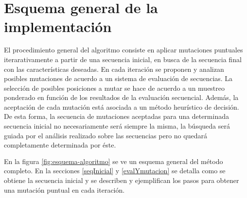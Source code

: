 
 










\section{Esquema general de la implementación}

El procedimiento general del algoritmo consiste en aplicar mutaciones puntuales iterarativamente a partir de una secuencia inicial, en busca de la secuencia final con las características deseadas.
En cada iteración se proponen y analizan posibles mutaciones de acuerdo a un sistema de evaluación de secuencias.
La selección de posibles posiciones a mutar se hace de acuerdo a un muestreo ponderado en función de los resultados de la evaluación secuencial.
Además, la aceptación de cada mutación está asociada a un método heurístico de decisión.
De esta forma, la secuencia de mutaciones aceptadas para una determinada secuencia inicial no necesariamente será siempre la misma, 
la búsqueda será guiada por el análisis realizado sobre las secuencias pero no quedará completamente determinada por éste. 

En la figura \ref{fig:esquema-algoritmo} se ve un esquema general del método completo. 
En la secciones \ref{seqInicial} y \ref{evalYmutacion} se detalla como se obtiene la secuencia inicial y se describen y ejemplifican los pasos para obtener una mutación puntual en cada iteración.


